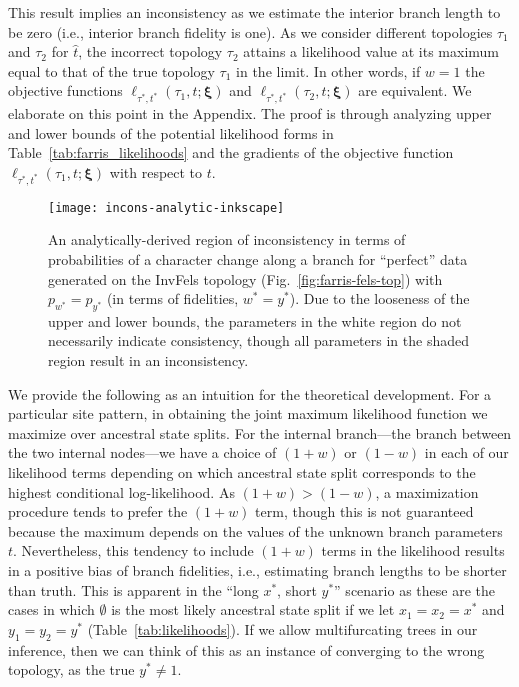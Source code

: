 \documentclass[11pt]{article}
\begin{document}
This result implies an inconsistency as we estimate the interior branch length to be zero (i.e., interior branch fidelity is one).
As we consider different topologies $\tau_1$ and $\tau_2$ for $\hat{t}$, the incorrect topology $\tau_2$ attains a likelihood value at its maximum equal to that of the true topology $\tau_1$ in the limit.
In other words, if $w=1$ the objective functions $\ell_{\tau^*,t^*}(\tau_1, t; \boldsymbol\xi)$ and $\ell_{\tau^*,t^*}(\tau_2, t; \boldsymbol\xi)$ are equivalent.
We elaborate on this point in the Appendix.
The proof is through analyzing upper and lower bounds of the potential likelihood forms in Table~\ref{tab:farris_likelihoods} and the gradients of the objective function $\ell_{\tau^*,t^*}(\tau_1, t; \boldsymbol\xi)$ with respect to $t$.

\begin{figure}
\centering
\texttt{[image: incons-analytic-inkscape]}
\caption{
    An analytically-derived region of inconsistency in terms of probabilities of a character change along a branch for ``perfect'' data generated on the InvFels topology (Fig.~\ref{fig:farris-fels-top}) with $p_{w^*} = p_{y^*}$ (in terms of fidelities, $w^*=y^*$).
    Due to the looseness of the upper and lower bounds, the parameters in the white region do not necessarily indicate consistency, though all parameters in the shaded region result in an inconsistency.
}
\label{fig:incons-analytic}
\end{figure}

We provide the following as an intuition for the theoretical development.
For a particular site pattern, in obtaining the joint maximum likelihood function we maximize over ancestral state splits.
For the internal branch---the branch between the two internal nodes---we have a choice of $(1+w)$ or $(1-w)$ in each of our likelihood terms depending on which ancestral state split corresponds to the highest conditional log-likelihood.
As $(1+w) > (1-w)$, a maximization procedure tends to prefer the $(1+w)$ term, though this is not guaranteed because the maximum depends on the values of the unknown branch parameters $t$.
Nevertheless, this tendency to include $(1+w)$ terms in the likelihood results in a positive bias of branch fidelities, i.e., estimating branch lengths to be shorter than truth.
This is apparent in the ``long $x^*$, short $y^*$'' scenario as these are the cases in which $\emptyset$ is the most likely ancestral state split if we let $x_1=x_2=x^*$ and $y_1=y_2=y^*$ (Table~\ref{tab:likelihoods}).
If we allow multifurcating trees in our inference, then we can think of this as an instance of converging to the wrong topology, as the true $y^*\neq 1$.
\end{document}
